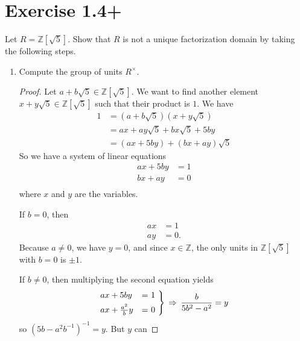 \documentclass[a4paper]{article}
\begin{document}
\section*{Exercise 1.4+}
Let \(R = \mathbb{Z}[\sqrt{5}]\). Show that \(R\) is not a unique factorization domain by taking the following steps.
\begin{enumerate}
  \item Compute the group of units \(R^\times\).
  \begin{proof}
    Let \(a + b \sqrt{5} \in \mathbb{Z}[\sqrt{5}]\). We want to find another element \(x + y \sqrt{5} \in \mathbb{Z}[\sqrt{5}]\) such that their product is \(1\). We have
    \begin{align*}
      1 &= (a + b \sqrt{5}) (x + y \sqrt{5}) \\
      &= ax + ay\sqrt{5} + bx \sqrt{5} + 5 by \\
      &= (ax + 5by) + (bx + ay) \sqrt{5}
    \end{align*}
    So we have a system of linear equations
    \begin{align*}
      ax + 5 by &= 1 \\
      bx + ay &= 0 \\
    \end{align*}
    where \(x\) and \(y\) are the variables.

    If \(b = 0\), then
    \begin{align*}
      ax &= 1 \\
      ay &= 0 \text{.}
    \end{align*}
    Because \(a \neq 0\), we have \(y = 0\), and since \(x \in \mathbb{Z}\), the only units in \(\mathbb{Z}[\sqrt{5}]\) with \(b = 0\) is \(\pm 1\).

    If \(b \neq 0\), then multiplying the second equation yields
    \begin{align*}
      \begin{rcases*}
        ax + 5by &= 1 \\
        ax + \frac{a^2}{b}y &= 0
      \end{rcases*}
      \, \Rightarrow \, \frac{b}{5b^2 - a^2} = y
    \end{align*}
    so \((5b - a^2 b^{-1})^{-1} = y\). But \(y\) can 
  \end{proof}
\end{enumerate}
\end{document}
